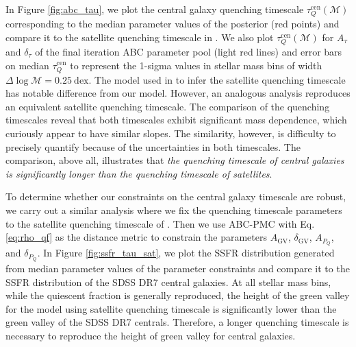 \documentclass[iop,apj,tighten,twocolappendix,numberedappendix]{emulateapj}
\begin{document}
In Figure \ref{fig:abc_tau}, we plot the central galaxy quenching timescale
$\tau^\mathrm{cen}_Q(\mathcal{M})$ corresponding to the median parameter 
values of the posterior (red points) and compare it to the satellite 
quenching timescale in \cite{Wetzel:2013aa}. We also plot 
$\tau^\mathrm{cen}_Q(\mathcal{M})$ for $A_\tau$ and $\delta_\tau$ of the 
final iteration ABC parameter pool (light red lines) and error bars on
median $\tau^\mathrm{cen}_Q$ to represent the 1-sigma values
in stellar mass bins of width $\Delta \log\mathcal{M} = 0.25~\mathrm{dex}$.
The model used in \cite{Wetzel:2013aa} to infer the satellite 
quenching timescale has notable difference from our model. However, 
an analogous analysis reproduces an equivalent satellite quenching timescale.
The comparison of the quenching timescales reveal that both timescales 
exhibit significant mass dependence, which curiously appear to have 
similar slopes. The similarity, however, is difficulty to precisely 
quantify because of the uncertainties in both timescales.
The comparison, above all, illustrates that {\em the quenching timescale 
of central galaxies is significantly longer than the quenching timescale 
of satellites}. 

To determine whether our constraints on the central galaxy 
timescale are robust, we carry out a similar analysis where
we fix the quenching timescale parameters to the satellite quenching 
timescale of \cite{Wetzel:2013aa}. Then we use ABC-PMC with 
Eq. \ref{eq:rho_qf} as the distance metric to constrain the 
parameters $A_\mathrm{GV}$, $\delta_\mathrm{GV}$, $A_{P_Q}$, 
and $\delta_{P_Q}$. In Figure \ref{fig:ssfr_tau_sat}, we plot 
the SSFR distribution generated from median parameter values 
of the parameter constraints and compare it to the SSFR 
distribution of the SDSS DR7 central galaxies. At all stellar 
mass bins, while the quiescent fraction is generally reproduced, 
the height of the green valley for the model using satellite 
quenching timescale is significantly lower than the green valley 
of the SDSS DR7 centrals. 
Therefore, a longer quenching timescale is necessary to 
reproduce the height of green valley for central galaxies.
\end{document}
